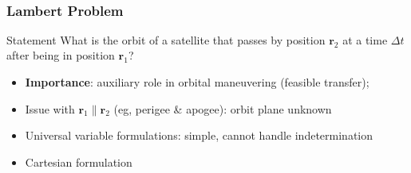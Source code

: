 \documentclass{beamer}
\begin{document}
\begin{frame}
\begin{columns}
\begin{column}{0.5\linewidth}
\begin{figure}[htbp]
                \caption{~\cite{curtis2015orbital}}
            \end{figure}
        \end{column}
    \end{columns}
\end{frame}

\begin{frame}
    \frametitle{Lambert Problem}
    \pause
    \begin{block}{Statement}
        What is the orbit of a satellite that passes by position \(\mathbf{r}_2\) at a time \(\Delta t\) after being in position \(\mathbf{r}_1\)?
    \end{block}
    \begin{itemize}\pause
        \item \textbf{Importance}: auxiliary role in orbital maneuvering (feasible transfer);\pause
        \item Issue with \(\mathbf{r}_1 \parallel \mathbf{r}_2\) (eg, perigee \& apogee): orbit plane unknown\pause
        \item Universal variable formulations: simple, cannot handle indetermination~\cite{curtis2015orbital}\cite{sukhanov}\pause
        \item Cartesian formulation~\cite{embedded_lambert}
    \end{itemize}
\end{frame}
\end{document}
